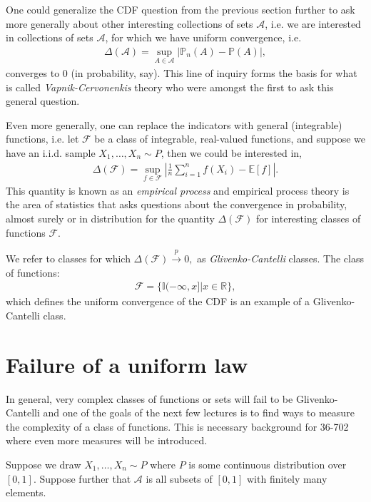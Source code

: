 \documentclass[twoside,12pt]{article}
\newcommand{\cprob}{\overset{p}{\rightarrow}}
\begin{document}
One could generalize the CDF question from the previous section further to ask more generally about other interesting collections of sets $\mathcal{A}$, i.e. we are interested in collections of sets $\mathcal{A}$, for which we have uniform convergence, i.e.
\begin{align*}
\Delta(\mathcal{A}) = \sup_{A \in \mathcal{A}} |\mathbb{P}_n(A) - \mathbb{P}(A)|,
\end{align*}
converges to 0 (in probability, say). This line of inquiry forms the basis for what is called \emph{Vapnik-Cervonenkis} theory who were amongst the first to ask this general question.

Even more generally, one can replace the indicators with general (integrable) functions, i.e. let $\mathcal{F}$ be a class of integrable, real-valued functions, and suppose we have an i.i.d. sample $X_1,\ldots,X_n \sim P$, then we could be interested in,
\begin{align*}
\Delta(\mathcal{F}) = \sup_{f \in \mathcal{F}} \left| \frac{1}{n} \sum_{i=1}^n f(X_i) - \mathbb{E}[f]\right|.
\end{align*}
This quantity is known as an \emph{empirical process} and empirical process theory is the area of statistics that asks questions about the convergence in probability, almost surely or in distribution for the quantity $\Delta(\mathcal{F})$ for interesting classes of functions $\mathcal{F}$.

We refer to classes for which $\Delta(\mathcal{F}) \cprob 0,$ as \emph{Glivenko-Cantelli} classes. The class of functions:
\begin{align*}
\mathcal{F} = \{ \mathbb{I}(-\infty,x] | x \in \mathbb{R}\},
\end{align*}
which defines the uniform convergence of the CDF is an example of a Glivenko-Cantelli class.

\section{Failure of a uniform law}
In general, very complex classes of functions or sets will fail to be Glivenko-Cantelli and one of the goals of the next few lectures is to find ways to measure the complexity of a class of functions. This is necessary background for 36-702 where even more measures will be introduced.

Suppose we draw $X_1,\ldots,X_n \sim P$ where $P$ is some continuous distribution over $[0,1]$. Suppose further that $\mathcal{A}$ is all subsets of $[0,1]$ with finitely many elements. 
\end{document}
